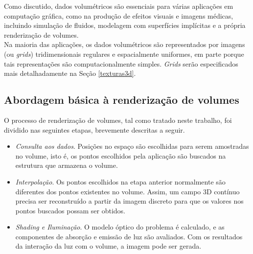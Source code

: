 
Como discutido, dados volumétricos são essenciais para várias aplicações em computação gráfica, como na produção de efeitos visuais e imagens médicas, incluindo simulação de fluidos, modelagem com superfícies implícitas e a própria renderização de volumes. \\


Na maioria das aplicações, os dados volumétricos são representados por imagens (ou \emph{grids}) tridimensionais regulares e espacialmente uniformes, em parte porque tais representações são computacionalmente simples. \emph{Grids} serão especificados mais detalhadamente na Seção \ref{texturas3d}.

\subsection*{Abordagem básica à renderização de volumes}
\label{approach}

O processo de renderização de volumes, tal como tratado neste trabalho, foi dividido nas seguintes etapas, brevemente descritas a seguir. \\

\begin{itemize}
\item \emph{Consulta aos dados}. Posições no espaço são escolhidas para serem amostradas no volume, isto é, os pontos escolhidos pela aplicação são buscados na estrutura que armazena o volume. 

\item \emph{Interpolação}. Os pontos escolhidos na etapa anterior normalmente são diferentes dos pontos existentes no volume. Assim, um campo 3D contínuo precisa ser reconstruído a partir da imagem discreto para que os valores nos pontos buscados possam ser obtidos. 

\item \emph{Shading e Iluminação}. O modelo óptico do problema é calculado, e as componentes de absorção e emissão de luz são avaliados. Com os resultados da interação da luz com o volume, a imagem pode ser gerada.
\end{itemize}

